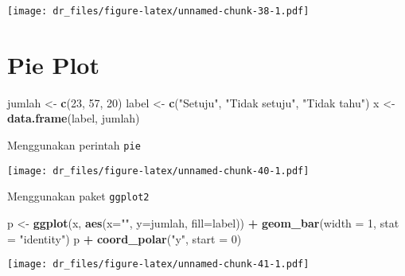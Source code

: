 \documentclass[
]{book}
\newenvironment{Shaded}{\begin{snugshade}}{\end{snugshade}}
\newcommand{\DataTypeTok}[1]{\textcolor[rgb]{0.13,0.29,0.53}{#1}}
\newcommand{\DecValTok}[1]{\textcolor[rgb]{0.00,0.00,0.81}{#1}}
\newcommand{\KeywordTok}[1]{\textcolor[rgb]{0.13,0.29,0.53}{\textbf{#1}}}
\newcommand{\NormalTok}[1]{#1}
\newcommand{\OperatorTok}[1]{\textcolor[rgb]{0.81,0.36,0.00}{\textbf{#1}}}
\newcommand{\StringTok}[1]{\textcolor[rgb]{0.31,0.60,0.02}{#1}}
\begin{document}
\texttt{[image: dr\_files/figure-latex/unnamed-chunk-38-1.pdf]}

\hypertarget{pie-plot}{%
\section{Pie Plot}\label{pie-plot}}

\begin{Shaded}
\begin{Highlighting}[]
\NormalTok{jumlah <-}\StringTok{ }\KeywordTok{c}\NormalTok{(}\DecValTok{23}\NormalTok{, }\DecValTok{57}\NormalTok{, }\DecValTok{20}\NormalTok{)}
\NormalTok{label <-}\StringTok{ }\KeywordTok{c}\NormalTok{(}\StringTok{"Setuju"}\NormalTok{, }\StringTok{"Tidak setuju"}\NormalTok{, }\StringTok{"Tidak tahu"}\NormalTok{)}
\NormalTok{x <-}\StringTok{ }\KeywordTok{data.frame}\NormalTok{(label, jumlah)}
\end{Highlighting}
\end{Shaded}

Menggunakan perintah \texttt{pie}

\begin{Shaded}
\end{Shaded}

\texttt{[image: dr\_files/figure-latex/unnamed-chunk-40-1.pdf]}

Menggunakan paket \texttt{ggplot2}

\begin{Shaded}
\begin{Highlighting}[]
\NormalTok{p <-}\StringTok{ }\KeywordTok{ggplot}\NormalTok{(x, }\KeywordTok{aes}\NormalTok{(}\DataTypeTok{x=}\StringTok{""}\NormalTok{, }\DataTypeTok{y=}\NormalTok{jumlah, }\DataTypeTok{fill=}\NormalTok{label)) }\OperatorTok{+}
\StringTok{  }\KeywordTok{geom_bar}\NormalTok{(}\DataTypeTok{width =} \DecValTok{1}\NormalTok{, }\DataTypeTok{stat =} \StringTok{"identity"}\NormalTok{)}
\NormalTok{p }\OperatorTok{+}\StringTok{ }\KeywordTok{coord_polar}\NormalTok{(}\StringTok{"y"}\NormalTok{, }\DataTypeTok{start =} \DecValTok{0}\NormalTok{)}
\end{Highlighting}
\end{Shaded}

\texttt{[image: dr\_files/figure-latex/unnamed-chunk-41-1.pdf]}
\end{document}
